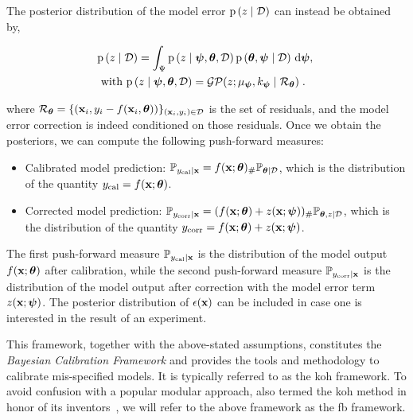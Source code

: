 The posterior distribution of the model error $\mathrm{p} \left( z \mid \mathcal{D} \right)$ can instead be obtained by,

\begin{equation}
    \left. 
        \begin{aligned}
            &\mathrm{p} \left( z \mid \mathcal{D} \right) = \int_{\Psi} \mathrm{p} \left( z \mid \boldsymbol{\psi},\boldsymbol{\theta}, \mathcal{D} \right) \mathrm{p} \left( \boldsymbol{\theta}, \boldsymbol{\psi} \mid \mathcal{D} \right)\, \text{d} \boldsymbol{\psi},\;\\
            &\text{ with } \mathrm{p} \left( z \mid \boldsymbol{\psi}, \boldsymbol{\theta}, \mathcal{D} \right) = \mathcal{GP}(z; \mu_{\boldsymbol{\psi}},k_{\boldsymbol{\psi}} \mid \mathcal{R}_{\boldsymbol{\theta}})\;.
        \end{aligned}
    \right.
    \label{eq:sota_1:z_pred}
\end{equation}

where $\mathcal{R}_{\boldsymbol{\theta}} = \{(\mathbf{x}_i, y_i - f(\mathbf{x}_i, \boldsymbol{\theta}))\}_{(\mathbf{x}_i,y_i) \in \mathcal{D}}$ is the set of residuals, and the model error correction is indeed conditioned on those residuals. Once we obtain the posteriors, we can compute the following push-forward measures:

\begin{itemize}
    \item Calibrated model prediction: $\mathbb{P}_{y_{\mathrm{cal}} \mid \mathbf{x}} = f(\mathbf{x};\boldsymbol{\theta})_{\#}\mathbb{P}_{\boldsymbol{\theta} \mid \mathcal{D}}$, which is the distribution of the quantity $y_{\mathrm{cal}} = f(\mathbf{x};\boldsymbol{\theta})$.
    \item Corrected model prediction: $\mathbb{P}_{y_{\mathrm{corr}} \mid \mathbf{x}} = (f(\mathbf{x};\boldsymbol{\theta}) + z(\mathbf{x};\boldsymbol{\psi}))_{\#}\mathbb{P}_{\boldsymbol{\theta},z \mid \mathcal{D}}$, which is the distribution of the quantity $y_{\mathrm{corr}} = f(\mathbf{x};\boldsymbol{\theta}) + z(\mathbf{x};\boldsymbol{\psi})$.
\end{itemize}

The first push-forward measure $\mathbb{P}_{y_{\mathrm{cal}} \mid \mathbf{x}}$ is the distribution of the model output $f(\mathbf{x};\boldsymbol{\theta})$ after calibration, while the second push-forward measure $\mathbb{P}_{y_{\mathrm{corr}} \mid \mathbf{x}}$ is the distribution of the model output after correction with the model error term $z(\mathbf{x};\boldsymbol{\psi})$. The posterior distribution of $\epsilon(\mathbf{x})$ can be included in case one is interested in the result of an experiment.

\smallskip
This framework, together with the above-stated assumptions, constitutes the \textit{Bayesian Calibration Framework} and provides the tools and methodology to calibrate mis-specified models. It is typically referred to as the \gls{koh} framework. To avoid confusion with a popular modular approach, also termed the \gls{koh} method in honor of its inventors~\cite{koh2001_sup}, we will refer to the above framework as the \gls{fb} framework.


